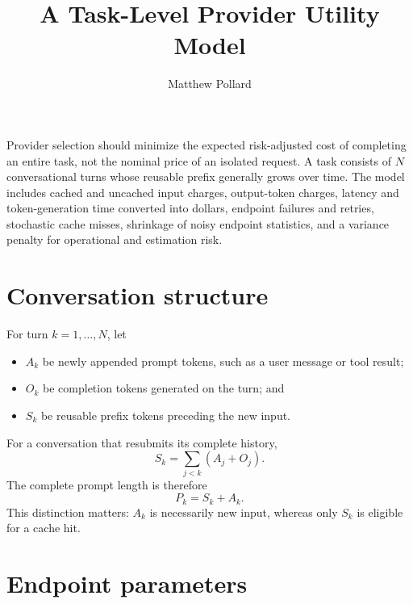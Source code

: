 \documentclass[11pt]{article}
\title{A Task-Level Provider Utility Model}
\author{Matthew Pollard}
\date{}
\begin{document}
\maketitle

Provider selection should minimize the expected risk-adjusted cost of completing an
entire task, not the nominal price of an isolated request. A task consists of $N$
conversational turns whose reusable prefix generally grows over time. The model
includes cached and uncached input charges, output-token charges, latency and
token-generation time converted into dollars, endpoint failures and retries,
stochastic cache misses, shrinkage of noisy endpoint statistics, and a variance
penalty for operational and estimation risk.

\section{Conversation structure}

For turn $k=1,\ldots,N$, let
\begin{itemize}[nosep]
  \item $A_k$ be newly appended prompt tokens, such as a user message or tool result;
  \item $O_k$ be completion tokens generated on the turn; and
  \item $S_k$ be reusable prefix tokens preceding the new input.
\end{itemize}

For a conversation that resubmits its complete history,
\begin{equation}
S_k=\sum_{j<k}(A_j+O_j).
\end{equation}
The complete prompt length is therefore
\begin{equation}
P_k=S_k+A_k.
\end{equation}
This distinction matters: $A_k$ is necessarily new input, whereas only $S_k$
is eligible for a cache hit.

\section{Endpoint parameters}
\end{document}
